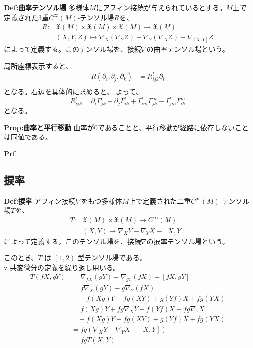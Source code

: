 \documentclass[a4paper,11pt]{jsarticle}
\numberwithin{equation}{section}
\begin{document}
\begin{itembox}[l]{\textbf{Def:曲率テンソル場}}
    多様体$M$にアフィン接続が与えられているとする。$M$上で定義された3重$C^\infty(M)$-テンソル場$R$を、
    \begin{align}
        R : &\mathfrak{X}(M) \times \mathfrak{X}(M) \times \mathfrak{X}(M) \to \mathfrak{X}(M) \\
        & (X,Y,Z) \mapsto \nabla_X(\nabla_YZ) - \nabla_Y(\nabla_XZ) - \nabla_{[X,Y]}Z
    \end{align}
    によって定義する。このテンソル場を、接続$\nabla$の曲率テンソル場という。

\end{itembox}
局所座標表示すると、
\begin{align}
    R(\partial_{i},\partial_{j},\partial_{k}) &= R_{ijk}^l\partial_{l}\\
\end{align}
となる。右辺を具体的に求めると、
よって、
\begin{equation}
    R_{ijk}^l = \partial_{i}\Gamma_{jk}^l - \partial_{j}\Gamma_{ik}^l + \Gamma_{im}^l\Gamma_{jk}^m - \Gamma_{jm}^l\Gamma_{ik}^m
\end{equation}
となる。

\begin{itembox}[l]{\textbf{Prop:曲率と平行移動}}
    曲率が0であることと、平行移動が経路に依存しないことは同値である。
\end{itembox}
\textbf{Prf}\\

\newpage
\subsection{捩率}
\begin{itembox}[l]{\textbf{Def:捩率}}
    アフィン接続$\nabla$をもつ多様体$M$上で定義された二重$C^\infty(M)$-テンソル場$T$を、
    \begin{align}
        T : &\mathfrak{X}(M) \times \mathfrak{X}(M) \to C^\infty(M) \\
        & (X,Y) \mapsto \nabla_XY - \nabla_YX - [X,Y]
    \end{align}
    によって定義する。このテンソル場を、接続$\nabla$の捩率テンソル場という。
\end{itembox}

このとき、\(T\) は \((1,2)\) 型テンソル場である。\\
$\because$ 共変微分の定義を繰り返し用いる。
\begin{align}
T(fX, gY) &= \nabla_{fX}(gY) - \nabla_{gY}(fX) - [fX, gY] \\
          &= f\nabla_X(gY) - g\nabla_Y(fX) \\
          &\quad - f(Xg)Y - fg(XY) + g(Yf)X + fg(YX) \\
          &= f(Xg)Y + fg\nabla_X Y - f(Yf)X - fg\nabla_Y X \\
          &\quad - f(Xg)Y - fg(XY) + g(Yf)X + fg(YX) \\
          &= fg(\nabla_X Y - \nabla_Y X - [X, Y]) \\
          &= fgT(X, Y)
\end{align}
\end{document}
